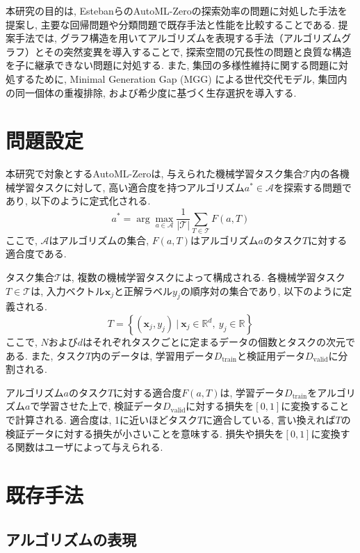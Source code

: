 \documentclass[a4paper,11pt,twocolumn]{jarticle}
\begin{document}
本研究の目的は, EstebanらのAutoML-Zeroの探索効率の問題に対処した手法を提案し, 主要な回帰問題や分類問題で既存手法と性能を比較することである. 提案手法では, グラフ構造を用いてアルゴリズムを表現する手法（アルゴリズムグラフ）とその突然変異を導入することで, 探索空間の冗長性の問題と良質な構造を子に継承できない問題に対処する. また, 集団の多様性維持に関する問題に対処するために, Minimal Generation Gap (MGG) \cite{mgg}による世代交代モデル, 集団内の同一個体の重複排除, および希少度に基づく生存選択を導入する.

\section{問題設定}\label{sec:problem}

本研究で対象とするAutoML-Zeroは, 与えられた機械学習タスク集合$\mathcal{T}$内の各機械学習タスクに対して, 高い適合度を持つアルゴリズム$a^\ast \in \mathcal{A}$を探索する問題であり, 以下のように定式化される.
\begin{equation}
  \label{eq:optimum}
  a^\ast =  \arg \max_{a \in \mathcal{A}} \frac{1}{|\mathcal{T}|} \sum_{T \in \mathcal{T}} F(a, T)
\end{equation}
\noindent
ここで, $\mathcal{A}$はアルゴリズムの集合, $F(a, T)$はアルゴリズム$a$のタスク$T$に対する適合度である.

タスク集合$\mathcal{T}$は, 複数の機械学習タスクによって構成される. 各機械学習タスク$T \in \mathcal{T}$は, 入力ベクトル$\bm{x}_j$と正解ラベル$y_j$の順序対の集合であり, 以下のように定義される.
$$
  T = \left\{\left(\bm{x}_j, y_j \right) \ |\ \bm{x}_j \in \mathbb{R}^{d},\ y_j \in \mathbb{R} \right\}
$$
\noindent
ここで, $N$および$d$はそれぞれタスクごとに定まるデータの個数とタスクの次元である. また, タスク$T$内のデータは, 学習用データ$D_\mathrm{train}$と検証用データ$D_\mathrm{valid} $に分割される.

アルゴリズム$a$のタスク$T$に対する適合度$F(a, T)$は, 学習データ$D_\mathrm{train}$をアルゴリズム$a$で学習させた上で, 検証データ$D_\mathrm{valid}$に対する損失を$[0,1]$に変換することで計算される. 適合度は, 1に近いほどタスク$T$に適合している, 言い換えれば$T$の検証データに対する損失が小さいことを意味する. 損失や損失を$[0,1]$に変換する関数はユーザによって与えられる.

\section{既存手法}\label{sec:conventional_method}

\subsection{アルゴリズムの表現}\label{subsec:existing_problem:algorithm_exp}
\end{document}
